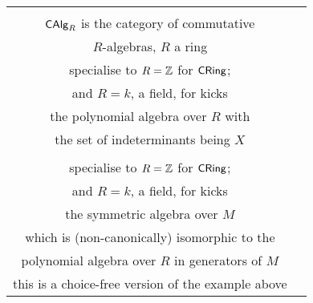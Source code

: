\begin{example}
\begin{center}
{\begin{longtable}{|c|c|}
    \hline
    \makecell{$U:\ncat{CAlg}_R \to \ncat{Set}$\\[0.2em] $\mathsf{CAlg}_R$ is the category of commutative\\ $R$-algebras, $R$ a ring\\[0.2em] specialise to $R = \mathbb Z$ for $\mathsf{CRing}$;\\ and $R = k$, a field, for kicks} & \makecell{$F(X) = R[\set{x}_{x\in X}]$\\[0.2em] the polynomial algebra over $R$ with\\ the set of indeterminants being $X$}\\
    \hline
    \makecell{$U:\ncat{CAlg}_R \to \ncat{Mod}_R$\\[0.2em] specialise to $R = \mathbb Z$ for $\mathsf{CRing}$;\\ and $R = k$, a field, for kicks} & \makecell{$F(M) = \mathrm{Sym}^\bullet_R(M)$\\[0.2em] the symmetric algebra over $M$\\ which is (non-canonically) isomorphic to the\\ polynomial algebra over $R$ in generators of $M$\\[0.2em] this is a choice-free version of the example above
    }\\
    \hline

\end{longtable}}
\end{center}
\end{example}
